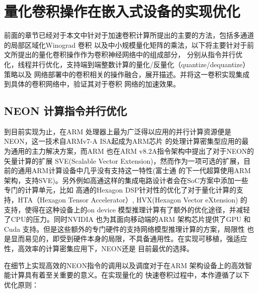
\chapter{量化卷积操作在嵌入式设备的实现优化}
\label{cha:chapter04}

前面的章节已经对于本文中针对于加速卷积计算所提出的主要的方法，包括多通道的局部区域化Winograd 卷积
以及中小规模量化矩阵的乘法，以下将主要针对于前文所提出的量化卷积操作作为卷积神经网络中的组成部分，
分别从指令并行优化，线程并行优化，支持端到端整数计算的量化/反量化（quantize/dequantize）策略以及
网络部署中的卷积相关的操作融合，展开描述。并将这一卷积实现集成到具体的卷积网络中，验证其对于卷积
网络的加速效果。

\section{NEON 计算指令并行优化}

到目前实现为止，在ARM 处理器上最为广泛得以应用的并行计算资源便是NEON，这一技术自ARMv7-A ISA起成为ARM芯片
的处理计算密集型应用的最为通用的主力解决方案，而ARM 也在ARM v8.2A指令架构中提出了对于NEON的矢量计算的扩展
SVE(Scalable Vector Extension)，然而作为一项可选的扩展，目前的通用ARM计算设备中几乎没有支持这一特性(富士通
的下一代超算使用ARM架构，支持SVE)。另外例如高通这样的集成电路设计者会在SoC方案中添加一些专门的计算单元，比如
高通的Hexagon DSP针对性的优化了对于量化计算的支持，HTA（Hexagon Tensor Accelerator）, HVX(Hexagon Vector 
eXtension) 的支持，使得在这种设备上的on device 模型推理计算有了额外的优化途径，并减轻了CPU的压力。同时NVIDIA
也为其面向移动端的ARM 架构芯片提供了GPU 和Cuda 支持。但是这些额外的专门硬件的支持网络模型推理计算的方案，局限性
也是显而易见的，即受到硬件本身的局限，不具备通用性。在实现可移植，强适应性，高效率的计算密集应用下，NEON还是
目前最优的选择。

在细节上实现高效的NEON指令的调用以及调度对于在ARM 架构设备上的高效智能计算具有着至关重要的意义。在实现量化的
快速卷积过程中，本作遵循了以下优化原则：

